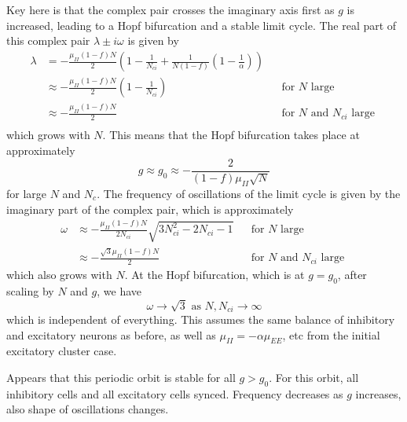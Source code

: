 \documentclass[11pt,reqno]{amsart}
\begin{document}
Key here is that the complex pair crosses the imaginary axis first as $g$ is increased, leading to a Hopf bifurcation and a stable limit cycle. The real part of this complex pair $\lambda \pm i \omega$ is given by
\begin{align*}
\lambda &= -\frac{\mu_{II} (1-f)N}{2}\left( 1 - \frac{1}{N_{ci}} + \frac{1}{N(1-f)}\left( 1 - \frac{1}{\alpha} \right) \right) \\
&\approx -\frac{\mu_{II} (1-f)N}{2}\left( 1 - \frac{1}{N_{ci}} \right) && \text{for $N$ large } \\
&\approx -\frac{\mu_{II} (1-f)N}{2} && \text{for $N$ and $N_{ci}$ large } \\
\end{align*}
which grows with $N$. This means that the Hopf bifurcation takes place at approximately
\[
g \approx g_0 \approx -\frac{2}{(1-f)\mu_{II}\sqrt{N}} 
\]
for large $N$ and $N_c$. The frequency of oscillations of the limit cycle is given by the imaginary part of the complex pair, which is approximately
\begin{align*}
\omega &\approx -\frac{\mu_{II} (1-f)N}{2 N_{ci} } \sqrt{ 3 N_{ci}^2 - 2 N_{ci} - 1} && \text{for $N$ large } \\
&\approx -\frac{\sqrt{3} \mu_{II} (1-f)N}{2 } && \text{for $N$ and $N_{ci}$ large }
\end{align*}
which also grows with $N$. At the Hopf bifurcation, which is at $g = g_0$, after scaling by $N$ and $g$, we have
\[
\omega \rightarrow \sqrt{3} \text{ as } N, N_{ci} \rightarrow \infty
\]
which is independent of everything. This assumes the same balance of inhibitory and excitatory neurons as before, as well as $\mu_{II} = -\alpha \mu_{EE}$, etc from the initial excitatory cluster case. 

Appears that this periodic orbit is stable for all $g > g_0$. For this orbit, all inhibitory cells and all excitatory cells synced. Frequency decreases as $g$ increases, also shape of oscillations changes.
\end{document}
